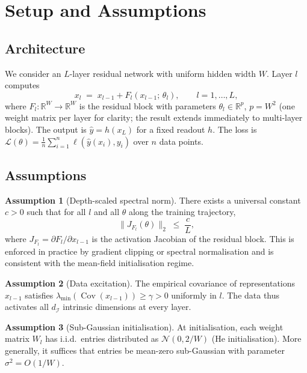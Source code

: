 \documentclass[11pt]{article}
\theoremstyle{plain}
\theoremstyle{definition}
\newtheorem{assumption}{Assumption}
\theoremstyle{remark}
\newcommand{\R}{\mathbb{R}}
\newcommand{\dI}{d_{\mathcal{I}}}
\newcommand{\Cov}{\operatorname{Cov}}
\begin{document}
\section{Setup and Assumptions}
\label{sec:setup}

\subsection{Architecture}

We consider an $L$-layer residual network with uniform hidden width $W$.
Layer $l$ computes
\[
  x_l \;=\; x_{l-1} + F_l(x_{l-1};\,\theta_l),
  \qquad l=1,\ldots,L,
\]
where $F_l:\R^W\to\R^W$ is the residual block with parameters
$\theta_l\in\R^p$, $p=W^2$ (one weight matrix per layer for clarity; the
result extends immediately to multi-layer blocks).  The output is
$\hat{y} = h(x_L)$ for a fixed readout $h$.  The loss is
$\mathcal{L}(\theta) = \tfrac{1}{n}\sum_{i=1}^n \ell(\hat{y}(x_i),y_i)$
over $n$ data points.

\subsection{Assumptions}

\begin{assumption}[Depth-scaled spectral norm]
\label{asm:spectral}
There exists a universal constant $c>0$ such that for all $l$ and all
$\theta$ along the training trajectory,
\[
  \bigl\|J_{F_l}(\theta)\bigr\|_2 \;\leq\; \frac{c}{L},
\]
where $J_{F_l} = \partial F_l/\partial x_{l-1}$ is the activation Jacobian
of the residual block.  This is enforced in practice by gradient clipping
\citep{zhang2020} or spectral normalisation \citep{miyato2018} and is
consistent with the mean-field initialisation regime.
\end{assumption}

\begin{assumption}[Data excitation]
\label{asm:excitation}
The empirical covariance of representations $x_{l-1}$ satisfies
$\lambda_{\min}\!\left(\Cov(x_{l-1})\right)\geq\gamma>0$ uniformly in $l$.
The data thus activates all $\dI$ intrinsic dimensions at every layer.
\end{assumption}

\begin{assumption}[Sub-Gaussian initialisation]
\label{asm:init}
At initialisation, each weight matrix $W_l$ has i.i.d.\ entries distributed
as $\mathcal{N}(0,2/W)$ (He initialisation).  More generally, it suffices
that entries be mean-zero sub-Gaussian with parameter $\sigma^2=O(1/W)$.
\end{assumption}
\end{document}
